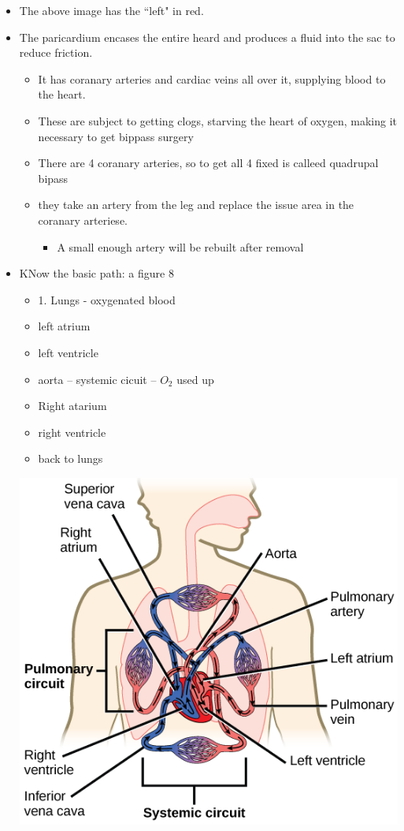 \documentclass{article}
\theoremstyle{definition}
\begin{document}
\begin{itemize}
	\item The above image has the ``left" in red.
	\item The paricardium encases the entire heard and produces a fluid into the sac to reduce friction.
		\begin{itemize}
			\item It has coranary arteries and cardiac veins all over it, supplying blood to the heart.
			\item These are subject to getting clogs, starving the heart of oxygen, making it necessary to get bippass surgery
			\item There are 4 coranary arteries, so to get all 4 fixed is calleed quadrupal bipass
			\item they take an artery from the leg and replace the issue area in the coranary arteriese.
				\begin{itemize}
					\item A small enough artery will be rebuilt after removal
				\end{itemize}
		\end{itemize}
	\item KNow the basic path: a figure 8
		\begin{itemize}
			\item 1. Lungs - oxygenated blood
			\item left atrium
			\item left ventricle
			\item aorta -- systemic cicuit -- $O_2$ used up
			\item Right atarium
			\item right ventricle
			\item back to lungs
		\end{itemize}
		\begin{center}
			\includegraphics[width=50em]{bloodpath}

\end{center}
\end{itemize}
\end{document}
